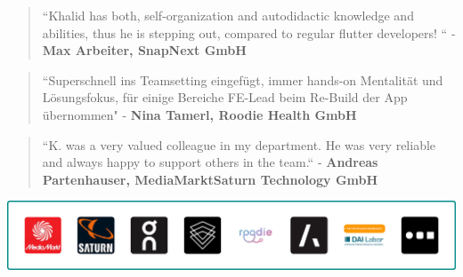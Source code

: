 \documentclass[10pt,a4paper,normalphoto]{altacv}
\begin{document}
\begin{fullwidth}
\vspace{.5em}
\begin{quote}
``Khalid has both, self-organization and autodidactic knowledge and abilities, thus he is stepping out, compared to regular flutter developers! `` - \textbf{Max Arbeiter, SnapNext GmbH}\\
\end{quote}

\vspace{.5em}    
\begin{quote}
``Superschnell ins Teamsetting eingefügt, immer hands-on Mentalität und Lösungsfokus, für einige Bereiche FE-Lead beim Re-Build der App übernommen" - \textbf{Nina Tamerl, Roodie Health GmbH}\\
\end{quote}

\vspace{.5em}
\begin{quote}
``K. was a very valued colleague in my department. He was very reliable and always happy to support others in the team.`` - \textbf{Andreas Partenhauser, MediaMarktSaturn Technology GmbH}\\
\end{quote}



\end{fullwidth}

\begin{center}
  \includegraphics[width=0.905\paperwidth]{company-logos-outline.png}
\end{center}
\end{document}
